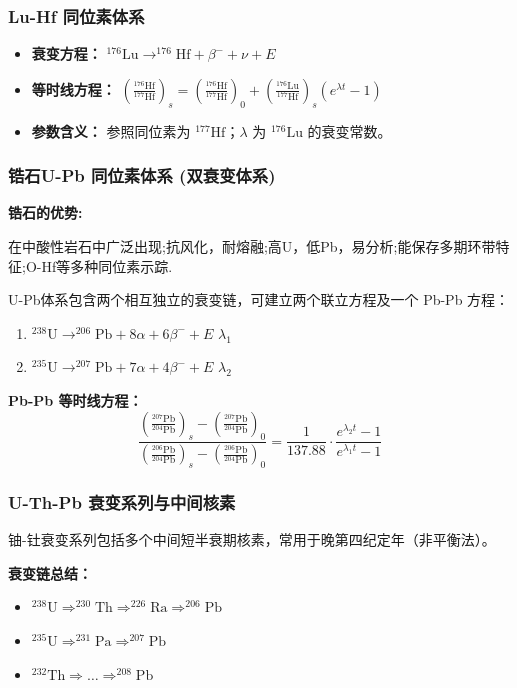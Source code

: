\documentclass[12pt,a4paper]{article}
\begin{document}
	\subsubsection{Lu-Hf 同位素体系}
	\begin{itemize}
		\item \textbf{衰变方程：} $^{176}\text{Lu} \rightarrow ^{176}\text{Hf} + \beta^- + \nu + E$
		\item \textbf{等时线方程：} 
		$\left( \frac{^{176}\text{Hf}}{^{177}\text{Hf}} \right)_s = \left( \frac{^{176}\text{Hf}}{^{177}\text{Hf}} \right)_0 + \left( \frac{^{176}\text{Lu}}{^{177}\text{Hf}} \right)_s (e^{\lambda t} - 1)$
		\item \textbf{参数含义：} 参照同位素为 $^{177}\text{Hf}$；$\lambda$ 为 $^{176}\text{Lu}$ 的衰变常数。
	\end{itemize}
	
	\subsubsection{锆石U-Pb 同位素体系 (双衰变体系)}
	\textbf{锆石的优势:}
	
	在中酸性岩石中广泛出现;抗风化，耐熔融;高U，低Pb，易分析;能保存多期环带特征;O-Hf等多种同位素示踪.
	
	U-Pb体系包含两个相互独立的衰变链，可建立两个联立方程及一个 Pb-Pb 方程：
	\begin{enumerate}
		\item $^{238}\text{U} \rightarrow ^{206}\text{Pb} + 8\alpha + 6\beta^- + E$ \quad $\lambda_1$
		\item $^{235}\text{U} \rightarrow ^{207}\text{Pb} + 7\alpha + 4\beta^- + E$ \quad $\lambda_2$
	\end{enumerate}
	\textbf{Pb-Pb 等时线方程：}
	\begin{equation}
		\frac{\left( \frac{^{207}\text{Pb}}{^{204}\text{Pb}} \right)_s - \left( \frac{^{207}\text{Pb}}{^{204}\text{Pb}} \right)_0}{\left( \frac{^{206}\text{Pb}}{^{204}\text{Pb}} \right)_s - \left( \frac{^{206}\text{Pb}}{^{204}\text{Pb}} \right)_0} = \frac{1}{137.88} \cdot \frac{e^{\lambda_2 t} - 1}{e^{\lambda_1 t} - 1}
	\end{equation}
	
	\subsubsection{U-Th-Pb 衰变系列与中间核素}
	铀-钍衰变系列包括多个中间短半衰期核素，常用于晚第四纪定年（非平衡法）。
	
	\textbf{衰变链总结：}
	\begin{itemize}
		\item $^{238}\text{U} \Rightarrow ^{230}\text{Th} \Rightarrow ^{226}\text{Ra} \Rightarrow ^{206}\text{Pb}$
		\item $^{235}\text{U} \Rightarrow ^{231}\text{Pa} \Rightarrow ^{207}\text{Pb}$
		\item $^{232}\text{Th} \Rightarrow \dots \Rightarrow ^{208}\text{Pb}$
	\end{itemize}
\end{document}
